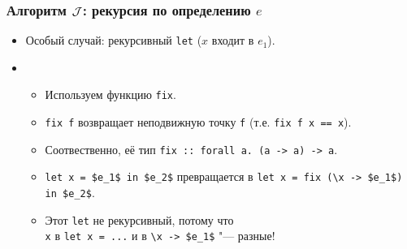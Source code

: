 \documentclass[11pt]{beamer}
\begin{document}

\begin{frame}[fragile]
\frametitle{Алгоритм $\mathcal{J}$: рекурсия по определению $e$}
\begin{itemize}
    \item Особый случай: рекурсивный \lstinline|let| ($x$ входит в $e_1$).
    \pause
    \item[]
    \begin{itemize}
        \item Используем функцию \lstinline|fix|.
        \item \lstinline|fix f| возвращает неподвижную точку \lstinline|f| (т.е. \lstinline|fix f x == x|). 
        \pause
        \item Соотвественно, её тип \pause \lstinline|fix :: forall a. (a -> a) -> a|.
        \pause
        \item \lstinline[mathescape]|let x = $e_1$ in $e_2$| превращается в \lstinline[mathescape]|let x = fix (\x -> $e_1$) in $e_2$|.
        \item Этот \lstinline|let| не рекурсивный, потому что
        \pause 
        \\ \lstinline|x| в \lstinline|let x = ...| и в \lstinline[mathescape]|\x -> $e_1$| "--- разные!
    \end{itemize}
\end{itemize}
\end{frame}
\end{document}
